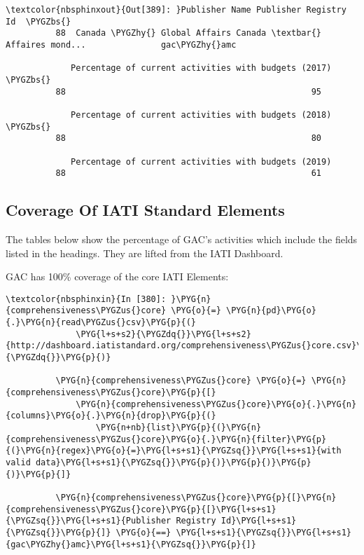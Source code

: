 \documentclass[letterpaper,10pt,english]{sphinxmanual}
\begin{document}
\begin{Verbatim}[commandchars=\\\{\}]
\textcolor{nbsphinxout}{Out[389]: }Publisher Name Publisher Registry Id  \PYGZbs{}
          88  Canada \PYGZhy{} Global Affairs Canada \textbar{} Affaires mond...               gac\PYGZhy{}amc
          
             Percentage of current activities with budgets (2017)  \PYGZbs{}
          88                                                 95
          
             Percentage of current activities with budgets (2018)  \PYGZbs{}
          88                                                 80
          
             Percentage of current activities with budgets (2019)
          88                                                 61
\end{Verbatim}


\subsection{Coverage Of IATI Standard Elements}
\label{\detokenize{Global Affairs Canada - Compliance Report:Coverage-Of-IATI-Standard-Elements}}
The tables below show the percentage of GAC's activities which include
the fields listed in the headings. They are lifted from the IATI
Dashboard.

GAC has 100\% coverage of the core IATI Elements:

\begin{Verbatim}[commandchars=\\\{\}]
\textcolor{nbsphinxin}{In [380]: }\PYG{n}{comprehensiveness\PYGZus{}core} \PYG{o}{=} \PYG{n}{pd}\PYG{o}{.}\PYG{n}{read\PYGZus{}csv}\PYG{p}{(}
              \PYG{l+s+s2}{\PYGZdq{}}\PYG{l+s+s2}{http://dashboard.iatistandard.org/comprehensiveness\PYGZus{}core.csv}\PYG{l+s+s2}{\PYGZdq{}}\PYG{p}{)}
          
          \PYG{n}{comprehensiveness\PYGZus{}core} \PYG{o}{=} \PYG{n}{comprehensiveness\PYGZus{}core}\PYG{p}{[}
              \PYG{n}{comprehensiveness\PYGZus{}core}\PYG{o}{.}\PYG{n}{columns}\PYG{o}{.}\PYG{n}{drop}\PYG{p}{(}
                  \PYG{n+nb}{list}\PYG{p}{(}\PYG{n}{comprehensiveness\PYGZus{}core}\PYG{o}{.}\PYG{n}{filter}\PYG{p}{(}\PYG{n}{regex}\PYG{o}{=}\PYG{l+s+s1}{\PYGZsq{}}\PYG{l+s+s1}{with valid data}\PYG{l+s+s1}{\PYGZsq{}}\PYG{p}{)}\PYG{p}{)}\PYG{p}{)}\PYG{p}{]}
          
          \PYG{n}{comprehensiveness\PYGZus{}core}\PYG{p}{[}\PYG{n}{comprehensiveness\PYGZus{}core}\PYG{p}{[}\PYG{l+s+s1}{\PYGZsq{}}\PYG{l+s+s1}{Publisher Registry Id}\PYG{l+s+s1}{\PYGZsq{}}\PYG{p}{]} \PYG{o}{==} \PYG{l+s+s1}{\PYGZsq{}}\PYG{l+s+s1}{gac\PYGZhy{}amc}\PYG{l+s+s1}{\PYGZsq{}}\PYG{p}{]}
\end{Verbatim}
\end{document}
